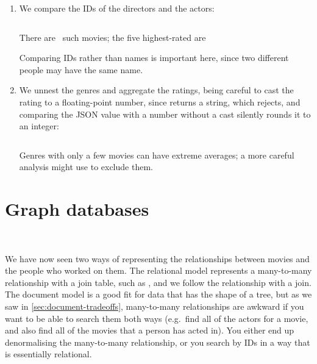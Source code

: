 {\begin{enumerate}
            An alternative is to unnest the  arrays of the movie documents and count the movies per director with , which should give the same result.
        \item We compare the IDs of the directors and the actors:
            \inputminted[fontsize=\small]{sql}{code/q-json-actor-director.sql}
            There are \jsonactordirector\ such movies; the five highest-rated are
            \begin{quote}\end{quote}
            Comparing IDs rather than names is important here, since two different people may have the same name.
        \item We unnest the genres and aggregate the ratings, being careful to cast the rating to a floating-point number, since \code{->>} returns a string, which  rejects, and comparing the JSON value with a number without a cast silently rounds it to an integer:
            \inputminted[fontsize=\small]{sql}{code/q-json-genre-rating.sql}
            \begin{quote}\end{quote}
            Genres with only a few movies can have extreme averages; a more careful analysis might use  to exclude them.
    \end{enumerate}
}

\section{Graph databases}\label{sec:graphs}

\begin{frame}
    \begin{center}
        {\Large{\color{darkblue}{Graph databases}}} \\[2em]
        \mydetails
    \end{center}
\end{frame}

We have now seen two ways of representing the relationships between movies and the people who worked on them.
The relational model represents a many-to-many relationship with a join table, such as , and we follow the relationship with a join.
The document model is a good fit for data that has the shape of a tree, but as we saw in \autoref{sec:document-tradeoffs}, many-to-many relationships are awkward if you want to be able to search them both ways (e.g.\ find all of the actors for a movie, and also find all of the movies that a person has acted in).
You either end up denormalising the many-to-many relationship, or you search by IDs in a way that is essentially relational.

